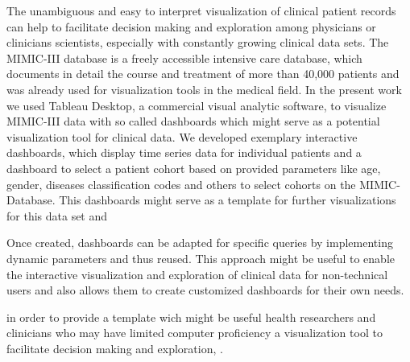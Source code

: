 The unambiguous and easy to interpret visualization of clinical patient records can help to facilitate decision making and exploration among physicians or clinicians scientists, especially with constantly growing clinical data sets. The MIMIC-III database is a freely accessible intensive care database, which documents in detail the course and treatment of more than 40,000 patients and was already used for visualization tools in the medical field. In the present work we used Tableau Desktop, a commercial visual analytic software, to visualize MIMIC-III data with so called dashboards which might serve as a potential visualization tool for clinical data. We developed exemplary interactive dashboards, which display time series data for individual patients and a dashboard to select a patient cohort based on provided parameters like age, gender, diseases classification codes and others to select cohorts on the MIMIC-Database. This dashboards might serve as a template for further visualizations for this data set and 

Once created, dashboards can be adapted for specific queries by implementing dynamic parameters and thus reused. This approach might be useful to enable the interactive visualization and exploration of clinical data for non-technical users and also allows them to create customized dashboards for their own needs.

 in order to provide a template wich might be useful health researchers and clinicians who may have limited computer proficiency a visualization tool to facilitate decision making and exploration, . 